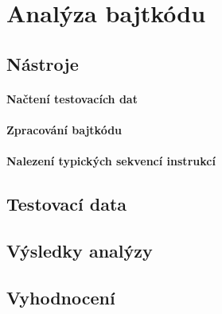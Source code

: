 \chapter{Analýza bajtkódu}


\section{Nástroje}


\subsubsection{Načtení testovacích dat}


\subsubsection{Zpracování bajtkódu}


\subsubsection{Nalezení typických sekvencí instrukcí}


\section{Testovací data}


\section{Výsledky analýzy}


\section{Vyhodnocení}


